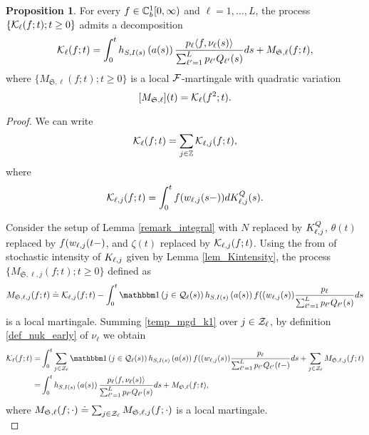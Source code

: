 \documentclass{article}
\theoremstyle{definition}
\newtheorem{proposition}[theorem]{Proposition}
\numberwithin{equation}{section}
\begin{document}
\begin{proposition}\label{prop_Kdecomp}
  For every $f\in\mathbb{C}_b^{1}[0,\infty)$ and $\ell=1,...,L$, the process $\{\mathcal{K}_\ell(f;t);t\geq0\}$ admits a decomposition
  \begin{equation}\label{Kdcomp}
    \mathcal{K}_\ell(f;t)= \int_0^t h_{S,I(s)}\left(a(s)\right) \frac{p_\ell \langle f,\nu_\ell(s)\rangle }{\sum_{\ell'=1}^Lp_{\ell'}Q_{\ell'}(s)} ds +M_{\mathfrak{S},\ell}(f;t),
  \end{equation}
  where $\{M_{\mathfrak{S},\ell}(f;t);t\geq0\}$ is a local $\mathcal{F}$-martingale with quadratic variation $$[M_{\mathfrak{S},\ell}](t)=\mathcal{K}_\ell(f^2;t).$$
\end{proposition}

\begin{proof}
  We can write
\begin{equation}\label{def_Kl_decomp}
\mathcal{K}_\ell(f;t)=\sum_{j\in\mathbb{Z}} \mathcal{K}_{\ell,j}(f;t),
\end{equation}
where
\begin{equation}\label{def_KClj}
\mathcal{K}_{\ell,j}(f;t)= \int_0^tf(w_{\ell,j}(s-))dK^Q_{\ell,j}(s).
\end{equation}


Consider the setup of Lemma \ref{remark_integral} with $N$ replaced by $K^Q_{\ell,j}$,  $\theta(t)$ replaced by $f(w_{\ell,j}(t-)$, and $\zeta(t)$ replaced by $\mathcal{K}_{\ell,j}(f;t)$. Using the from of stochastic intensity of $K_{\ell,j}$ given by Lemma \ref{lem_Kintensity}, the process $\{M_{\mathfrak{S},\ell,j}(f;t);t\geq0\}$ defined as
\begin{equation}\label{temp_mgd_k1}
M_{\mathfrak{S},\ell,j}(f;t) \doteq \entryC_{\ell,j}(f;t) - \int_0^t \indic{j\in\inque_\ell(s)} h_{S,\class(s)}\left(\age(s)\right) f((\waiting_{\ell,j}(s)) \frac{\weight_\ell}{\sum_{\ell'=1}^L\weight_{\ell'}\ql_{\ell'}(s)}ds
\end{equation}
is a local martingale. Summing \eqref{temp_mgd_k1} over $j\in\mathcal{Z}_\ell$, by definition \eqref{def_nuk_early} of $\nu_\ell$ we obtain
\begin{align*}
  \entryC_\ell(f;t) = &  \int_0^t \sum_{j\in\indexSet_\ell}\indic{j\in\inque_\ell(s)} h_{S,\class(s)}\left(\age(s)\right) f((\waiting_{\ell,j}(s)) \frac{\weight_\ell}{\sum_{\ell'=1}^L\weight_{\ell'}\ql_{\ell'}(t-)}ds+ \sum_{j\in\indexSet_\ell}M_{\mathfrak{S},\ell,j}(f;t)\\
   = & \int_0^t h_{S,\class(s)}\left(\age(s)\right) \frac{\weight_\ell \langle f,\nu_\ell(s)\rangle }{\sum_{\ell'=1}^L\weight_{\ell'}\ql_{\ell'}(s)} ds + M_{\mathfrak{S},\ell}(f;t),
\end{align*}
where $M_{\mathfrak{S},\ell} (f;\cdot)\doteq \sum_{j\in \mathcal{Z}_\ell}M_{\mathfrak{S},\ell,j}(f;\cdot)$ is a local martingale.\\


\end{proof}
\end{document}
